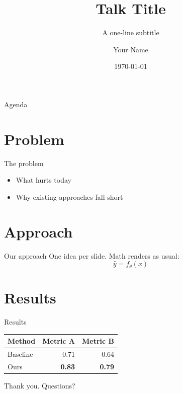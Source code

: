 \documentclass[aspectratio=169]{beamer}
\title{Talk Title}
\subtitle{A one-line subtitle}
\author{Your Name}
\institute{Example University}
\date{\today}
\begin{document}
\maketitle

\begin{frame}{Agenda}
  \tableofcontents
\end{frame}

\section{Problem}

\begin{frame}{The problem}
  \begin{itemize}
    \item What hurts today
    \item Why existing approaches fall short
  \end{itemize}
\end{frame}

\section{Approach}

\begin{frame}{Our approach}
  One idea per slide. Math renders as usual:
  \[ \hat{y} = f_\theta(x) \]
\end{frame}

\section{Results}

\begin{frame}{Results}
  \begin{table}
    \centering
    \begin{tabular}{lrr}
      \toprule
      Method & Metric A & Metric B \\
      \midrule
      Baseline & 0.71 & 0.64 \\
      Ours & \textbf{0.83} & \textbf{0.79} \\
      \bottomrule
    \end{tabular}
  \end{table}
\end{frame}

\begin{frame}[standout]
  Thank you. Questions?
\end{frame}
\end{document}
